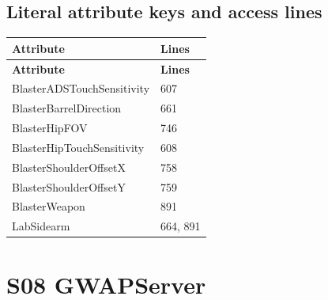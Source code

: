 \subsection{Literal attribute keys and access lines}
\begin{longtable}{p{}p{}}
\toprule
\textbf{Attribute} & \textbf{Lines} \\ \midrule
\endfirsthead
\textbf{Attribute} & \textbf{Lines} \\ \midrule
\endhead
BlasterADSTouchSensitivity & 607 \\
BlasterBarrelDirection & 661 \\
BlasterHipFOV & 746 \\
BlasterHipTouchSensitivity & 608 \\
BlasterShoulderOffsetX & 758 \\
BlasterShoulderOffsetY & 759 \\
BlasterWeapon & 891 \\
LabSidearm & 664, 891 \\
\bottomrule
\end{longtable}
\section{S08 GWAPServer}
